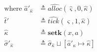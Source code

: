 \documentclass[12pt,draft]{article}
\begin{document}
{\begin{multicols*}{2}
\begin{center}
\end{center}
\vspace{-4mm}
\begin{align*}
  \text{where } \hat{a}'_{\hat{\kappa}} &\triangleq \widehat{alloc}(\hat{\varsigma}, 0, \hat{\kappa}) \\
  \hat{t}' &\triangleq \widehat{tick}(\hat{\varsigma}, 1, \hat{\kappa}) \\
  \hat{\kappa} &\triangleq \textbf{setk}(x, a) \\
  \hat{\sigma}'_{\hat{\kappa}} &\triangleq \hat{\sigma}_{\hat{\kappa}} \sqcup [\hat{a}'_{\hat{\kappa}} \mapsto \hat{\kappa}]
\end{align*}


\vfill\null
\columnbreak


\end{multicols*}}
\end{document}
